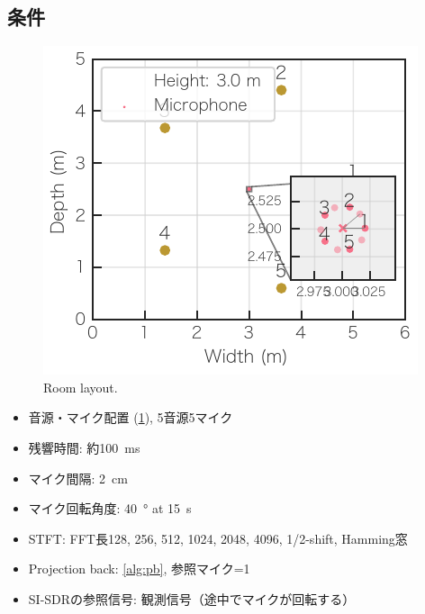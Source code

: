 \documentclass[sip,biber]{now-journal}
\begin{document}
\subsection*{条件}
\begin{figure}[t]
  \centering
  \includegraphics{figures/room_layout.pdf}
  \caption{Room layout.}%
  \label{fig:layout}
\end{figure}
\begin{itemize}
  \item 音源・マイク配置 (\cref{fig:layout}), 5音源5マイク
  \item 残響時間: 約\SI{100}{\milli\second}
  \item マイク間隔: \SI{2}{\centi\metre}
  \item マイク回転角度: \SI{40}{\degree} at \SI{15}{\second}
  \item STFT: FFT長128, 256, 512, 1024, 2048, 4096, 1/2-shift, Hamming窓
  \item Projection back: \cref{alg:pb}, 参照マイク=1
  \item SI-SDRの参照信号: 観測信号（途中でマイクが回転する）
\end{itemize}
\end{document}
